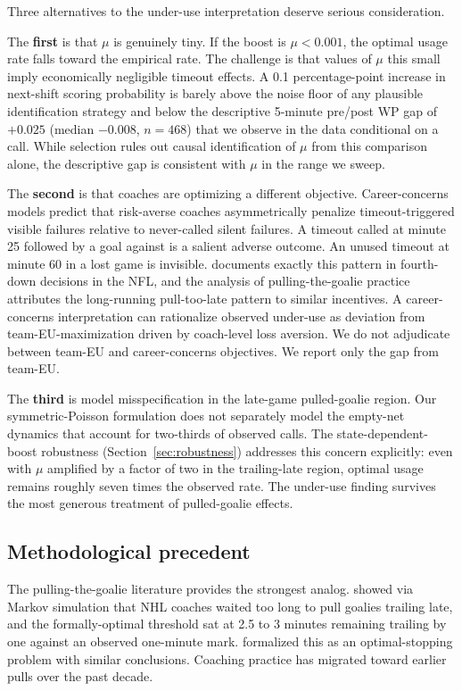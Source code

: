 \documentclass[11pt]{article}
\begin{document}
Three alternatives to the under-use interpretation deserve serious consideration.

The \textbf{first} is that $\mu$ is genuinely tiny. If the boost is $\mu < 0.001$, the optimal usage rate falls toward the empirical rate. The challenge is that values of $\mu$ this small imply economically negligible timeout effects. A 0.1 percentage-point increase in next-shift scoring probability is barely above the noise floor of any plausible identification strategy and below the descriptive 5-minute pre/post WP gap of $+0.025$ (median $-0.008$, $n = 468$) that we observe in the data conditional on a call. While selection rules out causal identification of $\mu$ from this comparison alone, the descriptive gap is consistent with $\mu$ in the range we sweep.

The \textbf{second} is that coaches are optimizing a different objective. Career-concerns models predict that risk-averse coaches asymmetrically penalize timeout-triggered visible failures relative to never-called silent failures. A timeout called at minute 25 followed by a goal against is a salient adverse outcome. An unused timeout at minute 60 in a lost game is invisible. \citet{Romer2006} documents exactly this pattern in fourth-down decisions in the NFL, and the \citet{BeaudoinSwartz2010} analysis of pulling-the-goalie practice attributes the long-running pull-too-late pattern to similar incentives. A career-concerns interpretation can rationalize observed under-use as deviation from team-EU-maximization driven by coach-level loss aversion. We do not adjudicate between team-EU and career-concerns objectives. We report only the gap from team-EU.

The \textbf{third} is model misspecification in the late-game pulled-goalie region. Our symmetric-Poisson formulation does not separately model the empty-net dynamics that account for two-thirds of observed calls. The state-dependent-boost robustness (Section~\ref{sec:robustness}) addresses this concern explicitly: even with $\mu$ amplified by a factor of two in the trailing-late region, optimal usage remains roughly seven times the observed rate. The under-use finding survives the most generous treatment of pulled-goalie effects.

\subsection{Methodological precedent}

The pulling-the-goalie literature provides the strongest analog. \citet{BeaudoinSwartz2010} showed via Markov simulation that NHL coaches waited too long to pull goalies trailing late, and the formally-optimal threshold sat at 2.5 to 3 minutes remaining trailing by one against an observed one-minute mark. \citet{Asmussen2011} formalized this as an optimal-stopping problem with similar conclusions. Coaching practice has migrated toward earlier pulls over the past decade.
\end{document}
